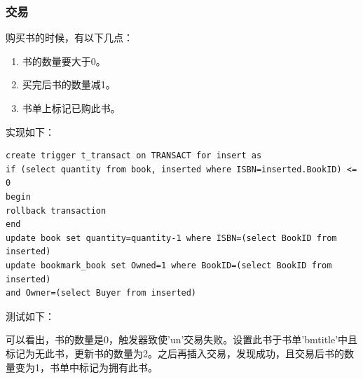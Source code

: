 \documentclass[UTF8, a4paper, 11pt]{article}
\begin{document}
\subsubsection{交易}
购买书的时候，有以下几点：
\begin{enumerate}
    \item 书的数量要大于0。
    \item 买完后书的数量减1。
    \item 书单上标记已购此书。
\end{enumerate}
实现如下：
\begin{lstlisting}
create trigger t_transact on TRANSACT for insert as
if (select quantity from book, inserted where ISBN=inserted.BookID) <= 0
begin
rollback transaction
end
update book set quantity=quantity-1 where ISBN=(select BookID from inserted)
update bookmark_book set Owned=1 where BookID=(select BookID from inserted)
and Owner=(select Buyer from inserted)
\end{lstlisting}
测试如下：
\begin{figure}[H]
\end{figure}
可以看出，书的数量是0，触发器致使'un'交易失败。设置此书于书单'bmtitle'中且标记为无此书，更新书的数量为2。之后再插入交易，发现成功，且交易后书的数量变为1，书单中标记为拥有此书。
\end{document}
